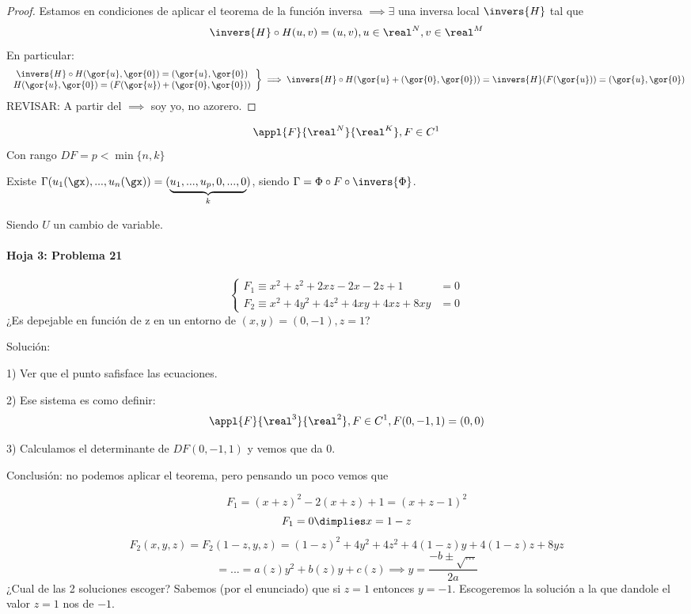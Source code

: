 \begin{proof}
Estamos en condiciones de aplicar el teorema de la función inversa $ \implies \exists$ una inversa local $\invers{H}$ tal que
\[\invers{H} \circ H(u,v) = (u,v), u\in \real^N,v\in\real^M\]
En particular:
\[\left. \begin{array}{c} \invers{H} \circ H (\gor{u},\gor{0}) = (\gor{u},\gor{0})\\
H(\gor{u},\gor{0}) = (F(\gor{u}) + (\gor{0}, \gor{0})) \end{array} \right\} \implies \invers{H} \circ H(\gor{u}+(\gor{0},\gor{0})) = \invers{H}(F(\gor{u})) = (\gor{u},\gor{0})\]
REVISAR: A partir del $\implies$ soy yo, no azorero.
\end{proof}

\begin{theorem}
\[\appl{F}{\real^N}{\real^K}, F\in C^1\]
Con rango $DF = p < \min\{n,k\}$

Existe $\Gamma (u_1(\gx),...,u_n(\gx)) = (\underbrace{u_1,...,u_p,0,...,0}_{k})$, siendo $\Gamma = \Phi \circ F \circ \invers{\Phi}$.
 
 Siendo $U$ un cambio de variable.
\end{theorem}

\paragraph{Hoja 3: Problema 21}

\[\left\{\begin{array}{cc}
   F_1\equiv x^2+z^2+2xz-2x-2z+1&=0\\
   F_2\equiv x^2+4y^2+4z^2+4xy+4xz+8xy&=0
  \end{array}\right.\]
  ¿Es depejable en función de z en un entorno de $(x,y) = (0,-1), z=1$?
  
Solución:

1) Ver que el punto safisface las ecuaciones.

2) Ese sistema es como definir:
\[\appl{F}{\real^3}{\real^2}, F\in C^1, F(0,-1,1) = (0,0)\]

3) Calculamos el determinante de $DF(0,-1,1)$ y vemos que da $0$. 

Conclusión: no podemos aplicar el teorema, pero pensando un poco vemos que 

\[F_1 = (x+z)^2 -2(x+z) + 1 = (x+z-1)^2\]
\[F_1 = 0 \dimplies x=1-z\]
\[F_2(x,y,z) = F_2(1-z,y,z) = (1-z)^2 + 4y^2 + 4z^2 + 4(1-z)y + 4(1-z)z+8yz\]
\[ =... = a(z)y^2+b(z)y+c(z) \implies y=\frac{-b\pm \sqrt{...}}{2a}\]
¿Cual de las 2 soluciones escoger? Sabemos (por el enunciado) que si $z=1$ entonces $y=-1$. Escogeremos la solución a la que dandole el valor $z=1$ nos de $-1$.

